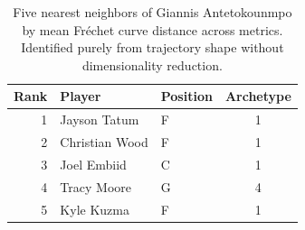 \begin{table}[htbp]
  \centering\small
  \begin{tabular}{rllc}
    \toprule
    Rank & Player & Position & Archetype \\
    \midrule
    1 & Jayson Tatum & F & 1 \\
    2 & Christian Wood & F & 1 \\
    3 & Joel Embiid & C & 1 \\
    4 & Tracy Moore & G & 4 \\
    5 & Kyle Kuzma & F & 1 \\
    \bottomrule
  \end{tabular}
  \caption{Five nearest neighbors of Giannis Antetokounmpo by mean Fr\'{e}chet curve distance across metrics. Identified purely from trajectory shape without dimensionality reduction.}
  \label{tab:Giannis_Antetokounmpo_frechet_curve_neighbors}
\end{table}

